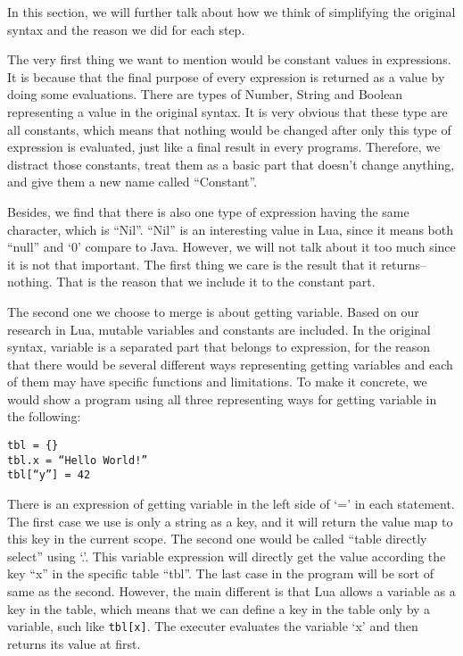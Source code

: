 In this section, we will further talk about how we think of simplifying the original syntax and the reason we did for each step.

The very first thing we want to mention would be constant values in expressions. It is because that the final purpose of every expression is returned as a value by doing some evaluations. There are types of Number, String and Boolean representing a value in the original syntax. It is very obvious that these type are all constants, which means that nothing would be changed after only this type of expression is evaluated, just like a final result in every programs. Therefore, we distract those constants, treat them as a basic part that doesn’t change anything, and give them a new name called ``Constant''.

Besides, we find that there is also one type of expression having the same character, which is ``Nil''. ``Nil'' is an interesting value in Lua, since it means both ``null'' and `0' compare to Java. However, we will not talk about it too much since it is not that important. The first thing we care is the result that it returns--nothing. That is the reason that we include it to the constant part.

The second one we choose to merge is about getting variable. Based on our research in Lua, mutable variables and constants are included. In the original syntax, variable is a separated part that belongs to expression, for the reason that there would be several different ways representing getting variables and each of them may have specific functions and limitations. To make it concrete, we would show a program using all three representing ways for getting variable in the following:
\begin{flushleft}
\tt tbl = \{\}\\
\tt tbl.x = ``Hello World!''\\
\tt tbl[``y''] = 42\\
\end{flushleft}

There is an expression of getting variable in the left side of `=' in each statement. The first case we use is only a string as a key, and it will return the value map to this key in the current scope. The second one would be called ``table directly select'' using `.'. This variable expression will directly get the value according the key ``x'' in the specific table ``tbl''. The last case in the program will be sort of same as the second. However, the main different is that Lua allows a variable as a key in the table, which means that we can define a key in the table only by a variable, such like {\tt tbl[x]}. The executer evaluates the variable `x’ and then returns its value at first.

